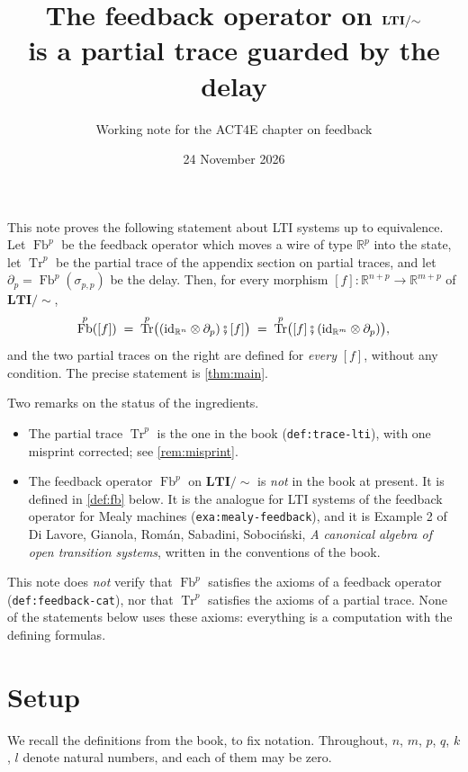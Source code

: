 \documentclass[11pt,a4paper]{article}
\title{The feedback operator on $\LTIq$\\ is a partial trace guarded by the delay}
\author{Working note for the ACT4E chapter on feedback}
\date{24 November 2026}
\theoremstyle{plain}
\theoremstyle{definition}
\theoremstyle{remark}
\DeclareMathOperator{\Fb}{Fb}
\DeclareMathOperator{\Tr}{Tr}
\newcommand{\R}{\mathbb{R}}
\newcommand{\id}{\mathrm{id}}
\newcommand{\then}{\mathbin{\fatsemi}}
\newcommand{\LTIq}{\mathbf{LTI}/{\sim}}
\newcommand{\lbl}[1]{\nolinkurl{#1}}
\begin{document}
\maketitle

\noindent
This note proves the following statement about LTI systems up to equivalence.
Let $\Fb^p$ be the feedback operator which moves a wire of type $\R^p$ into the state, let $\Tr^p$ be the partial trace of the appendix section on partial traces, and let $\partial_p = \Fb^p(\sigma_{p,p})$ be the delay.
Then, for every morphism $[f] \colon \R^{n+p} \to \R^{m+p}$ of $\LTIq$,
\begin{equation}
    \label{eq:headline}
    \Fb^p([f])
    \;=\; \Tr^p\bigl( (\id_{\R^n} \otimes \partial_p) \then [f] \bigr)
    \;=\; \Tr^p\bigl( [f] \then (\id_{\R^m} \otimes \partial_p) \bigr),
\end{equation}
and the two partial traces on the right are defined for \emph{every} $[f]$, without any condition.
The precise statement is \cref{thm:main}.

Two remarks on the status of the ingredients.
\begin{itemize}[nosep]
    \item The partial trace $\Tr^p$ is the one in the book (\lbl{def:trace-lti}), with one misprint corrected; see \cref{rem:misprint}.
    \item The feedback operator $\Fb^p$ on $\LTIq$ is \emph{not} in the book at present.
          It is defined in \cref{def:fb} below.
          It is the analogue for LTI systems of the feedback operator for Mealy machines (\lbl{exa:mealy-feedback}), and it is Example 2 of Di Lavore, Gianola, Rom\'an, Sabadini, Soboci\'nski, \emph{A canonical algebra of open transition systems}, written in the conventions of the book.
\end{itemize}
This note does \emph{not} verify that $\Fb^p$ satisfies the axioms of a feedback operator (\lbl{def:feedback-cat}), nor that $\Tr^p$ satisfies the axioms of a partial trace.
None of the statements below uses these axioms: everything is a computation with the defining formulas.

\section{Setup}

We recall the definitions from the book, to fix notation.
Throughout, $n$, $m$, $p$, $q$, $k$, $l$ denote natural numbers, and each of them may be zero.
\end{document}
